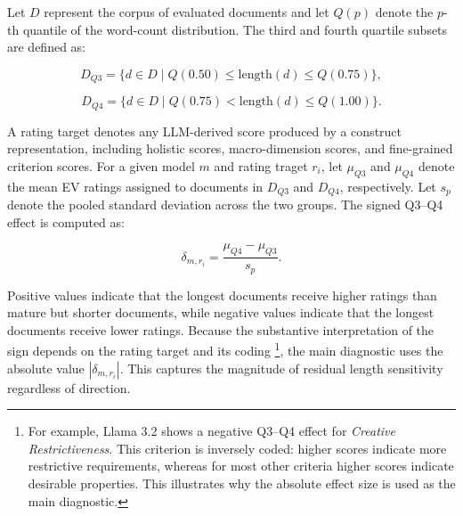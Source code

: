 



Let $D$ represent the corpus of evaluated documents and let $Q(p)$ denote the $p$-th quantile of the word-count distribution. The third and fourth quartile subsets are defined as:


\[
D_{Q3} = \{d \in D \mid Q(0.50) \leq \mathrm{length}(d) \leq Q(0.75)\},
\]

\[
D_{Q4} = \{d \in D \mid Q(0.75) < \mathrm{length}(d) \leq Q(1.00)\}.
\]




A rating target denotes any LLM-derived score produced by a construct representation, including holistic scores, macro-dimension scores, and fine-grained criterion scores. For a given model $m$ and rating traget $r_i$, let $\mu_{Q3}$ and $\mu_{Q4}$ denote the mean EV ratings assigned to documents in $D_{Q3}$ and $D_{Q4}$, respectively. Let $s_p$ denote the pooled standard deviation across the two groups. The signed Q3--Q4 effect is computed as:

\[
\delta_{m,r_i} = \frac{\mu_{Q4} - \mu_{Q3}}{s_p}.
\]



Positive values indicate that the longest documents receive higher ratings than mature but shorter documents, while negative values indicate that the longest documents receive lower ratings. Because the substantive interpretation of the sign depends on the rating target and its coding \footnote{For example, Llama 3.2 shows a negative Q3--Q4 effect for \textit{Creative Restrictiveness}. This criterion is inversely coded: higher scores indicate more restrictive requirements, whereas for most other criteria higher scores indicate desirable properties. This illustrates why the absolute effect size is used as the main diagnostic.}, the main diagnostic uses the absolute value $|\delta_{m,r_i}|$. This captures the magnitude of residual length sensitivity regardless of direction.

